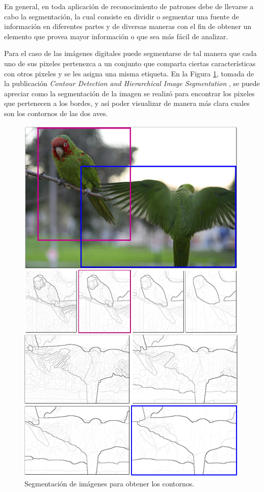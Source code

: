 En general, en toda aplicación de reconocimiento de patrones debe de llevarse a cabo la segmentación, la cual consiste en dividir o segmentar una fuente de información en diferentes partes y de diversas maneras con el fin de obtener un elemento que provea mayor información o que sea más fácil de analizar.

Para el caso de las imágenes digitales puede segmentarse de tal manera que cada uno de sus pixeles pertenezca a un conjunto que comparta ciertas características con otros pixeles y se les asigna una misma etiqueta. En la Figura \ref{fig:imgseg1}, tomada de la publicación \textit{Contour Detection and Hierarchical Image Segmentation} \cite{imgseg}, se puede apreciar como la segmentación de la imagen se realizó para encontrar los pixeles que pertenecen a los bordes, y así poder visualizar de manera más clara cuales son los contornos de las dos aves. 

\begin{figure}
	\includegraphics[width=0.63\linewidth]{images/imgseg}
	\caption{Segmentación de imágenes para obtener los contornos.} \label{fig:imgseg1}
\end{figure}

